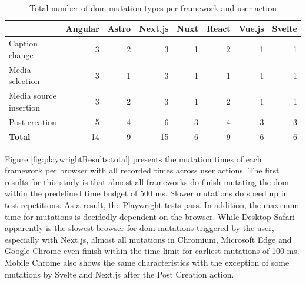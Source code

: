 \documentclass[a4paper, 12pt]{article}
\begin{document}
\begin{table}[!ht]
  \centering
  \begin{adjustbox}{angle=90}
    \begin{tabular}{|l|r|r|r|r|r|r|r|}
      \hline
      ~                       & \textbf{Angular}  & \textbf{Astro}  & \textbf{Next.js}  & \textbf{Nuxt} & \textbf{React}  & \textbf{Vue.js} & \textbf{Svelte} \\ \hline
      Caption change          & 3                 & 2               & 3                 & 1             & 2               & 1               & 1               \\ \hline
      Media selection         & 3                 & 1               & 3                 & 1             & 1               & 1               & 1               \\ \hline
      Media source insertion  & 3                 & 2               & 3                 & 1             & 2               & 1               & 1               \\ \hline
      Post creation           & 5                 & 4               & 6                 & 3             & 4               & 3               & 3               \\ \hline\hline
      \textbf{Total}          & 14                & 9               & 15                & 6             & 9               & 6               & 6               \\ \hline
    \end{tabular}
  \end{adjustbox}
  \caption{Total number of \acrshort{dom} mutation types per framework and user action}
  \label{tab:mutations:total}
\end{table}

Figure \ref{fig:playwrightResults:total} presents the mutation times of each framework per browser with all recorded times across user actions.
The first results for this study is that almost all frameworks do finish mutating the \acrshort{dom} within the predefined time budget of 500 ms.
Slower mutations do speed up in test repetitions.
As a result, the Playwright tests pass.
In addition, the maximum time for mutations is decidedly dependent on the browser.
While Desktop Safari apparently is the slowest browser for \acrshort{dom} mutations triggered by the user, especially with Next.js, almost all mutations in Chromium, Microsoft Edge and Google Chrome even finish within the time limit for earliest mutations of 100 ms.
Mobile Chrome also shows the same characteristics with the exception of some mutations by Svelte and Next.js after the Post Creation action.
\end{document}
